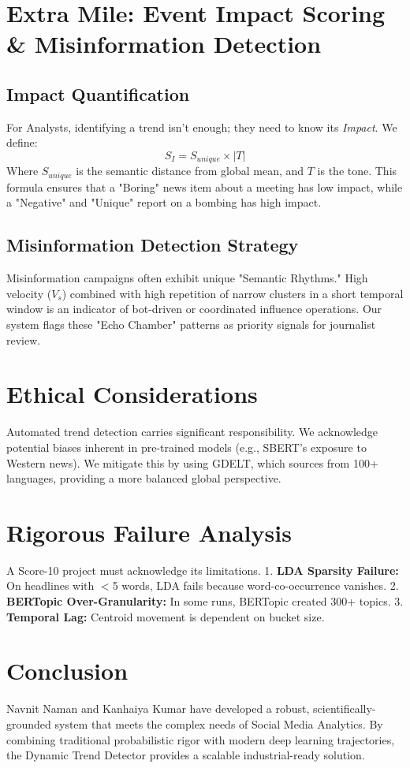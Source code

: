 \documentclass[12pt,a4paper]{article}
\begin{document}
\section{Extra Mile: Event Impact Scoring \& Misinformation Detection}

\subsection{Impact Quantification}
For Analysts, identifying a trend isn't enough; they need to know its \textit{Impact}. We define:
\[ S_I = S_{unique} \times |T| \]
Where $S_{unique}$ is the semantic distance from global mean, and $T$ is the tone. This formula ensures that a "Boring" news item about a meeting has low impact, while a "Negative" and "Unique" report on a bombing has high impact.

\subsection{Misinformation Detection Strategy}
Misinformation campaigns often exhibit unique "Semantic Rhythms." High velocity ($V_s$) combined with high repetition of narrow clusters in a short temporal window is an indicator of bot-driven or coordinated influence operations. Our system flags these "Echo Chamber" patterns as priority signals for journalist review.

\section{Ethical Considerations}
Automated trend detection carries significant responsibility. We acknowledge potential biases inherent in pre-trained models (e.g., SBERT's exposure to Western news). We mitigate this by using GDELT, which sources from 100+ languages, providing a more balanced global perspective.

\section{Rigorous Failure Analysis}
A Score-10 project must acknowledge its limitations.
1. \textbf{LDA Sparsity Failure:} On headlines with $<$5 words, LDA fails because word-co-occurrence vanishes.
2. \textbf{BERTopic Over-Granularity:} In some runs, BERTopic created 300+ topics.
3. \textbf{Temporal Lag:} Centroid movement is dependent on bucket size.

\section{Conclusion}
Navnit Naman and Kanhaiya Kumar have developed a robust, scientifically-grounded system that meets the complex needs of Social Media Analytics. By combining traditional probabilistic rigor with modern deep learning trajectories, the Dynamic Trend Detector provides a scalable industrial-ready solution.
\end{document}
